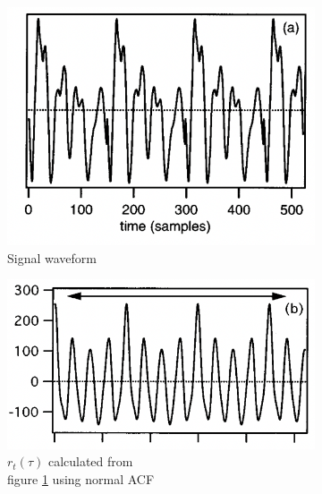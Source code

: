 \begin{enumerate}
    \begin{figure}
        \centering
        \begin{subfigure}{.3\textwidth}
          \centering
          \includegraphics[width=1\linewidth]{Figures/signalwaveform.png}
          \caption{Signal waveform}
          \label{signal}
        \end{subfigure}%
        \begin{subfigure}{.3\textwidth}
            \centering
            \includegraphics[width=1\linewidth]{Figures/acf.png}
            \caption{$r_t(\tau)$ calculated from \\figure \ref{signal} using normal ACF}
            \label{acf}
          \end{subfigure}%
        \begin{subfigure}{.3\textwidth}
          \centering

\end{subfigure}
\end{figure}
\end{enumerate}
